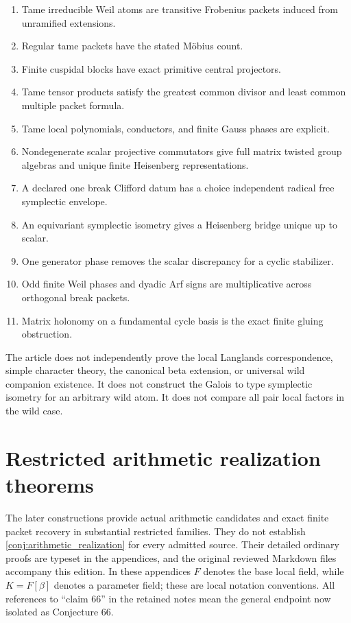 \documentclass[11pt]{amsart}
\theoremstyle{definition}
\theoremstyle{remark}
\begin{document}
\begin{enumerate}
\item Tame irreducible Weil atoms are transitive Frobenius packets induced from unramified extensions.
\item Regular tame packets have the stated Möbius count.
\item Finite cuspidal blocks have exact primitive central projectors.
\item Tame tensor products satisfy the greatest common divisor and least common multiple packet formula.
\item Tame local polynomials, conductors, and finite Gauss phases are explicit.
\item Nondegenerate scalar projective commutators give full matrix twisted group algebras and unique finite Heisenberg representations.
\item A declared one break Clifford datum has a choice independent radical free symplectic envelope.
\item An equivariant symplectic isometry gives a Heisenberg bridge unique up to scalar.
\item One generator phase removes the scalar discrepancy for a cyclic stabilizer.
\item Odd finite Weil phases and dyadic Arf signs are multiplicative across orthogonal break packets.
\item Matrix holonomy on a fundamental cycle basis is the exact finite gluing obstruction.
\end{enumerate}

The article does not independently prove the local Langlands correspondence, simple character theory, the canonical beta extension, or universal wild companion existence. It does not construct the Galois to type symplectic isometry for an arbitrary wild atom. It does not compare all pair local factors in the wild case.

\section{Restricted arithmetic realization theorems}
\label{sec:arithmetic_progress}

The later constructions provide actual arithmetic candidates and exact
finite packet recovery in substantial restricted families. They do not
establish \cref{conj:arithmetic_realization} for every admitted source.
Their detailed ordinary proofs are typeset in the appendices, and the
original reviewed Markdown files accompany this edition. In these
appendices \(F\) denotes the base local field, while \(K=F[\beta]\)
denotes a parameter field; these are local notation conventions.
All references to ``claim 66'' in the retained notes mean the general
endpoint now isolated as Conjecture 66.
\end{document}
